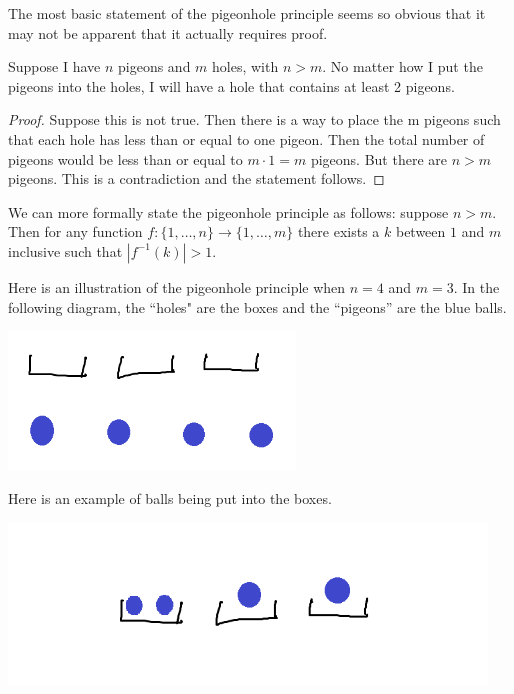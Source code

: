The most basic statement of the pigeonhole principle seems so obvious that it may not be apparent that it actually requires proof.

\begin{proposition}
Suppose I have $n$ pigeons and $m$ holes, with $n > m$. No matter how I put the pigeons into the holes, I will have a hole that contains at least 2 pigeons.
\end{proposition}
\begin{proof}
Suppose this is not true. Then there is a way to place the m pigeons such that each hole has less than or equal to one pigeon. Then the total number of pigeons would be less than or equal to $m \cdot 1 = m$ pigeons. But there are $n > m$ pigeons. This is a contradiction and the statement follows.
\end{proof}

We can more formally state the pigeonhole principle as follows: suppose $n > m$. Then for any function $f:\{1, \dots, n\} \to \{1, \dots, m\}$ there exists a $k$ between $1$ and $m$ inclusive such that $|f^{-1}(k)| > 1$.

\begin{example}
Here is an illustration of the pigeonhole principle when $n = 4$ and $m = 3$. In the following diagram, the ``holes" are the boxes and the ``pigeons'' are the blue balls.

\begin{centering}
\includegraphics[width=3in]{Ch9/pigeonholeex11}
\end{centering}

Here is an example of balls being put into the boxes.

\begin{centering}
\includegraphics[width=5in]{Ch9/pigeonholeex12}
\end{centering}

\end{example}

